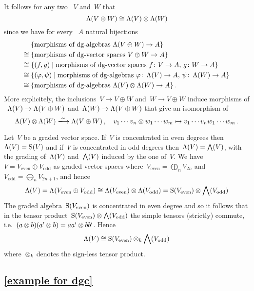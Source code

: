 \documentclass[a4paper,10pt,headings=standardclasses]{scrartcl}
\begin{document}
It follows for any two {\dgvs}~$V$ and~$W$ that
\[
  \operatorname{\Lambda}(V \oplus W)
  \cong
  \operatorname{\Lambda}(V) \otimes \operatorname{\Lambda}(W)
\]
since we have for every {\dga}~$A$ natural bijections
\begin{align*}
  {}&
  \{ \text{morphisms of {\dgas}~$\dgSymm(V \oplus W) \to A$} \}
  \\
  \cong{}&
  \{ \text{morphisms of {\dgvs}~$V \oplus W \to A$} \}
  \\
  \cong{}&
  \{
    (f,g)
  \suchthat
    \text{morphisms of {\dgvs}~$f \colon V \to A$,~$g \colon W \to A$}
  \}
  \\
  \cong{}&
  \{
    (\varphi, \psi)
  \suchthat
    \text{morphisms of {\dgas}~$\varphi \colon \dgSymm(V) \to A$,~$\psi \colon \dgSymm(W) \to A$}
  \}
  \\
  \cong{}&
  \{ \text{morphisms of {\dgas}~$\dgSymm(V) \tensor \dgSymm(W) \to A$} \} \,.
\end{align*}
More explicitely, the inclusions~$V \to V \oplus W$ and~$W \to V \oplus W$ induce morphisms of {\dgas}~$\operatorname{\Lambda}(V) \to \operatorname{\Lambda}(V \oplus W)$ and~$\operatorname{\Lambda}(W) \to \operatorname{\Lambda}(V \oplus W)$ that give an isomorphism of {\dgas}
\[
  \dgSymm(V) \tensor \dgSymm(W)
  \xlongto{\sim}
  \dgSymm(V \oplus W) \,,
  \quad
  v_1 \dotsm v_n \tensor w_1 \dotsm w_m
  \mapsto
  v_1 \dotsm v_n w_1 \dotsm w_m \,.
\]

Let~$V$ be a graded vector space.
If~$V$ is concentrated in even degrees then~$\operatorname{\Lambda}(V) = \operatorname{S}(V)$ and if~$V$ is concentrated in odd degrees then~$\operatorname{\Lambda}(V) = \bigwedge(V)$, with the grading of~$\operatorname{\Lambda}(V)$ and~$\bigwedge(V)$ induced by the one of~$V$.
We have~$V = V_{\text{even}} \oplus V_{\text{odd}}$ as graded vector spaces where~$V_{\text{even}} = \bigoplus_n V_{2n}$ and~$V_{\text{odd}} = \bigoplus_n V_{2n+1}$, and hence
\[
  \operatorname{\Lambda}(V)
  =
  \operatorname{\Lambda}(V_{\text{even}} \oplus V_{\text{odd}})
  \cong
  \operatorname{\Lambda}(V_{\text{even}}) \otimes \operatorname{\Lambda}(V_{\text{odd}})
  =
  \operatorname{S}(V_{\text{even}}) \otimes \bigwedge(V_{\text{odd}})
\]
The graded algebra~$\operatorname{S}(V_{\text{even}})$ is concentrated in even degree and so it follows that in the tensor product~$\operatorname{S}(V_{\text{even}}) \otimes \bigwedge(V_{\text{odd}})$ the simple tensors (strictly) commute, i.e.~$(a \otimes b)(a' \otimes b) = a a' \otimes b b'$.
Hence
\[
  \operatorname{\Lambda}(V)
  \cong
  \operatorname{S}(V_{\text{even}}) \otimes_k \bigwedge(V_{\text{odd}})
\]
where~$\otimes_k$ denotes the sign-less tensor product.



\subsection{\cref{example for dgc}}
\label{example for dgc proof}
\end{document}
